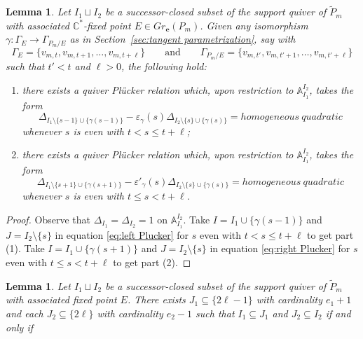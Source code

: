 \documentclass{amsart}
\newtheorem{lemma}[theorem]{Lemma}
\numberwithin{equation}{section}
\renewcommand{\AA}{\mathbb{A}}
\newcommand{\CC}{\mathbb{C}}
\newcommand{\bfe}{\mathbf{e}}
\begin{document}
  \begin{lemma}
    Let $I_1\sqcup I_2$ be a successor-closed subset of the support quiver of $\tilde P_m$ with associated $\CC^*$-fixed point $E\in Gr_\bfe(P_m)$.
    Given any isomorphism $\gamma:\Gamma_E\to\Gamma_{P_m/E}$ as in Section~\ref{sec:tangent parametrization}, say with
    \[\Gamma_E=\{v_{m,t},v_{m,t+1},\ldots,v_{m,t+\ell}\}\qquad\text{and}\qquad\Gamma_{P_m/E}=\{v_{m,t'},v_{m,t'+1},\ldots,v_{m,t'+\ell}\}\]
    such that $t'<t$ and $\ell>0$, the following hold:
    \begin{enumerate}
      \item there exists a quiver Pl\"ucker relation which, upon restriction to $\AA_{I_1}^{I_2}$, takes the form
        \[\Delta_{I_1\setminus\{s-1\}\cup\{\gamma(s-1)\}}-\varepsilon_\gamma(s)\Delta_{I_2\setminus\{s\}\cup\{\gamma(s)\}}=homogeneous~quadratic\]
        whenever $s$ is even with $t<s\le t+\ell$;
      \item there exists a quiver Pl\"ucker relation which, upon restriction to $\AA_{I_1}^{I_2}$, takes the form
        \[\Delta_{I_1\setminus\{s+1\}\cup\{\gamma(s+1)\}}-\varepsilon'_\gamma(s)\Delta_{I_2\setminus\{s\}\cup\{\gamma(s)\}}=homogeneous~quadratic\]
        whenever $s$ is even with $t\le s<t+\ell$.
    \end{enumerate}
  \end{lemma}
  \begin{proof}
    Observe that $\Delta_{I_1}=\Delta_{I_2}=1$ on $\AA_{I_1}^{I_2}$.
    Take $I=I_1\cup\{\gamma(s-1)\}$ and $J=I_2\setminus\{s\}$ in equation \eqref{eq:left Plucker} for $s$ even with $t<s\le t+\ell$ to get part (1).
    Take $I=I_1\cup\{\gamma(s+1)\}$ and $J=I_2\setminus\{s\}$ in equation \eqref{eq:right Plucker} for $s$ even with $t\le s<t+\ell$ to get part (2).
  \end{proof}

  \begin{lemma}
    Let $I_1\sqcup I_2$ be a successor-closed subset of the support quiver of $\tilde P_m$ with associated fixed point $E$.
    There exists $J_1\subseteq\{2\ell-1\}$ with cardinality $e_1+1$ and each $J_2\subseteq\{2\ell\}$ with cardinality $e_2-1$ such that $I_1\subseteq J_1$ and $J_2\subseteq I_2$ if and only if
  \end{lemma}
\end{document}
